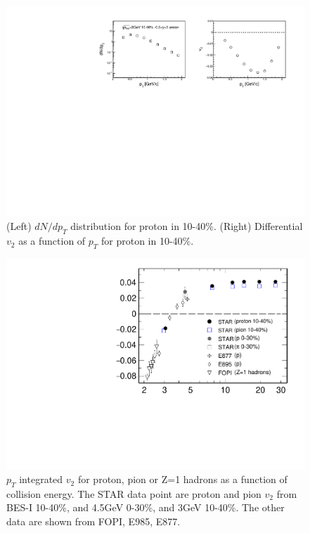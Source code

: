 \begin{figure}
    \centering
    \includegraphics[scale=0.6]{FXT3gev/chapter4/fig/v2integral_proton.pdf}
    \caption{(Left) $dN/dp_{T}$ distribution for proton in 10-40\%. (Right) Differential $v_{2}$ as a function of $p_{T}$ for proton in 10-40\%.}
    \label{fig:dndpt_v2pt_proton}
\end{figure}

\begin{figure}
    \centering
    \includegraphics[scale=0.5]{FXT3gev/chapter4/fig/v2_energy.pdf}
    \caption{$p_{T}$ integrated $v_{2}$ for proton, pion or Z=1 hadrons as a function of collision energy. The STAR data point are proton and pion $v_{2}$ from BES-I 10-40\%, and 4.5GeV 0-30\%, and 3GeV 10-40\%. The other data are shown from FOPI, E985, E877.}
    \label{fig:v2_energy}
\end{figure}

